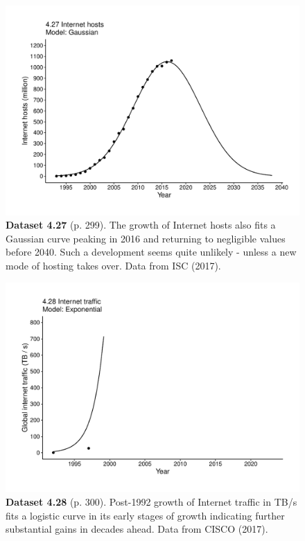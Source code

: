 \documentclass[aps,rmp,preprint,superscriptaddress,10pt,onecolumn]{article}
\begin{document}
\clearpage
\begin{figure}[h]
\includegraphics[width=\textwidth]{output/figs-ggplot/4.27.pdf}
\caption*{\textbf{Dataset 4.27} (p. 299). The growth of Internet hosts also fits a Gaussian curve peaking in 2016 and returning to negligible values before 2040. Such a development seems quite unlikely - unless a new mode of hosting takes over. Data from ISC (2017).}
\end{figure}
	
\clearpage
\begin{figure}[h]
\includegraphics[width=\textwidth]{output/figs-ggplot/4.28.pdf}
\caption*{\textbf{Dataset 4.28} (p. 300). Post-1992 growth of Internet traffic in TB/s fits a logistic curve in its early stages of growth indicating further substantial gains in decades ahead. Data from CISCO (2017).}
\end{figure}
	
\end{document}
